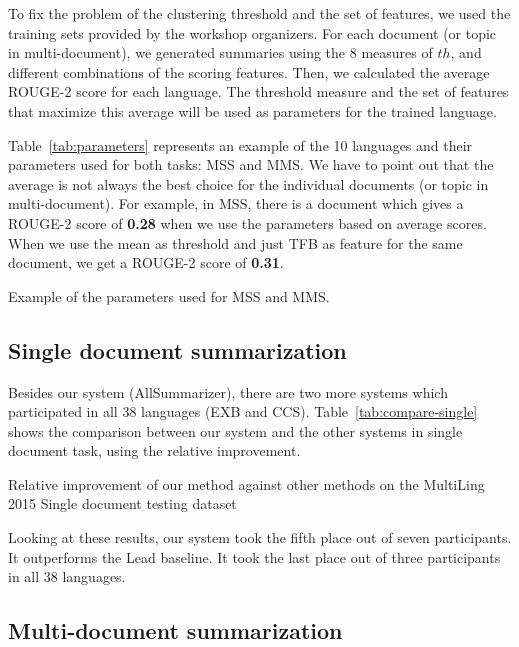 To fix the problem of the clustering threshold and the set of features, we used the training sets provided by the workshop organizers.
For each document (or topic in multi-document), we generated summaries using the 8 measures of $ th $, and different combinations of the scoring features. 
Then, we calculated the average ROUGE-2 score for each language. 
The threshold measure and the set of features that maximize this average will be used as parameters for the trained language. 

Table~\ref{tab:parameters} represents an example of the 10 languages and their parameters used for both tasks: MSS and MMS. 
We have to point out that the average is not always the best choice for the individual documents (or topic in multi-document). 
For example, in MSS, there is a document which gives a ROUGE-2 score of \textbf{0.28} when we use the parameters based on average scores. 
When we use the mean as threshold and just TFB as feature for the same document, we get a ROUGE-2 score of \textbf{0.31}.

\begin{table*}[!ht]
	\centering
	\caption{Example of the parameters used for MSS and MMS.}
	\label{tab:parameters}
\end{table*}



\subsection{Single document summarization}

Besides our system (AllSummarizer), there are two more systems which participated in all 38 languages (EXB and CCS). 
Table~\ref{tab:compare-single} shows the comparison between our system and the other systems in single document task, using the relative improvement.
%
\begin{table*}[!ht]
	\centering
	\caption{Relative improvement of our method against other methods on the MultiLing 2015 Single document testing dataset}
	\label{tab:compare-single}
\end{table*}

Looking at these results, our system took the fifth place out of seven participants. 
It outperforms the Lead baseline.
It took the last place out of three participants in all 38 languages.


\subsection{Multi-document summarization}

